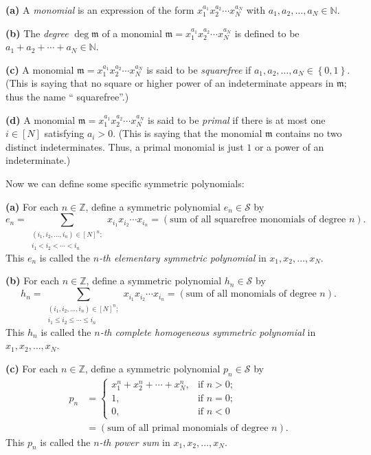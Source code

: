 \begin{definition}
\label{def.sf.monomial}\textbf{(a)} A \emph{monomial} is an expression of the
form $x_{1}^{a_{1}}x_{2}^{a_{2}}\cdots x_{N}^{a_{N}}$ with $a_{1},a_{2}%
,\ldots,a_{N}\in\mathbb{N}$. \medskip

\textbf{(b)} The \emph{degree} $\deg\mathfrak{m}$ of a monomial $\mathfrak{m}%
=x_{1}^{a_{1}}x_{2}^{a_{2}}\cdots x_{N}^{a_{N}}$ is defined to be $a_{1}%
+a_{2}+\cdots+a_{N}\in\mathbb{N}$. \medskip

\textbf{(c)} A monomial $\mathfrak{m}=x_{1}^{a_{1}}x_{2}^{a_{2}}\cdots
x_{N}^{a_{N}}$ is said to be \emph{squarefree} if $a_{1},a_{2},\ldots,a_{N}%
\in\left\{  0,1\right\}  $. (This is saying that no square or higher power of
an indeterminate appears in $\mathfrak{m}$; thus the name \textquotedblleft
squarefree\textquotedblright.) \medskip

\textbf{(d)} A monomial $\mathfrak{m}=x_{1}^{a_{1}}x_{2}^{a_{2}}\cdots
x_{N}^{a_{N}}$ is said to be \emph{primal} if there is at most one
$i\in\left[  N\right]  $ satisfying $a_{i}>0$. (This is saying that the
monomial $\mathfrak{m}$ contains no two distinct indeterminates. Thus, a
primal monomial is just $1$ or a power of an indeterminate.)
\end{definition}

Now we can define some specific symmetric polynomials:

\begin{definition}
\label{def.sf.ehp}\textbf{(a)} For each $n\in\mathbb{Z}$, define a symmetric
polynomial $e_{n}\in\mathcal{S}$ by%
\[
e_{n}=\sum_{\substack{\left(  i_{1},i_{2},\ldots,i_{n}\right)  \in\left[
N\right]  ^{n};\\i_{1}<i_{2}<\cdots<i_{n}}}x_{i_{1}}x_{i_{2}}\cdots x_{i_{n}%
}=\left(  \text{sum of all squarefree monomials of degree }n\right)  .
\]
This $e_{n}$ is called the $n$\emph{-th elementary symmetric polynomial} in
$x_{1},x_{2},\ldots,x_{N}$. \medskip

\textbf{(b)} For each $n\in\mathbb{Z}$, define a symmetric polynomial
$h_{n}\in\mathcal{S}$ by%
\[
h_{n}=\sum_{\substack{\left(  i_{1},i_{2},\ldots,i_{n}\right)  \in\left[
N\right]  ^{n};\\i_{1}\leq i_{2}\leq\cdots\leq i_{n}}}x_{i_{1}}x_{i_{2}}\cdots
x_{i_{n}}=\left(  \text{sum of all monomials of degree }n\right)  .
\]
This $h_{n}$ is called the $n$\emph{-th complete homogeneous symmetric
polynomial} in $x_{1},x_{2},\ldots,x_{N}$. \medskip

\textbf{(c)} For each $n\in\mathbb{Z}$, define a symmetric polynomial
$p_{n}\in\mathcal{S}$ by%
\begin{align*}
p_{n}  &  =%
\begin{cases}
x_{1}^{n}+x_{2}^{n}+\cdots+x_{N}^{n}, & \text{if }n>0;\\
1, & \text{if }n=0;\\
0, & \text{if }n<0
\end{cases}
\\
&  =\left(  \text{sum of all primal monomials of degree }n\right)  .
\end{align*}
This $p_{n}$ is called the $n$\emph{-th power sum} in $x_{1},x_{2}%
,\ldots,x_{N}$.
\end{definition}

